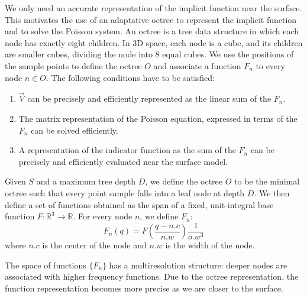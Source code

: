 \documentclass[12pt]{article}
\begin{document}
We only need an accurate representation of the implicit function near the surface. This motivates the use of an adaptative octree to represent the implicit function and to solve the Poisson system. An octree is a tree data structure in which each node has exactly eight children. In 3D space, each node is a cube, and its children are smaller cubes, dividing the node into 8 equal cubes. We use the positions of the sample points to define the octree $O$ and associate a function $F_n$ to every node $n \in O$. The following conditions have to be satisfied:
\begin{enumerate}
\item $\vec{V}$ can be precisely and efficiently represented as the linear sum of the $F_n$.
\item The matrix representation of the Poisson equation, expressed in terms of the $F_n$ can be solved efficiently.
\item A representation of the indicator function as the sum of the $F_n$ can be precisely and efficiently evaluated near the surface model.
\end{enumerate}

Given $S$ and a maximum tree depth $D$, we define the octree $O$ to be the minimal octree such that every point sample falls into a leaf node at depth $D$. We then define a set of functions obtained as the span of a fixed, unit-integral base function $F: \mathbb{R}^3 \to \mathbb{R}$. For every node $n$, we define $F_n$:
$$F_n(q) = F(\frac{q - n.c}{n.w})\frac{1}{o.w^3}$$
where $n.c$ is the center of the node and $n.w$ is the width of the node.

The space of functions $\{F_n\}$ has a multiresolution structure: deeper nodes are associated with higher frequency functions. Due to the octree representation, the function representation becomes more precise as we are closer to the surface.
\end{document}
